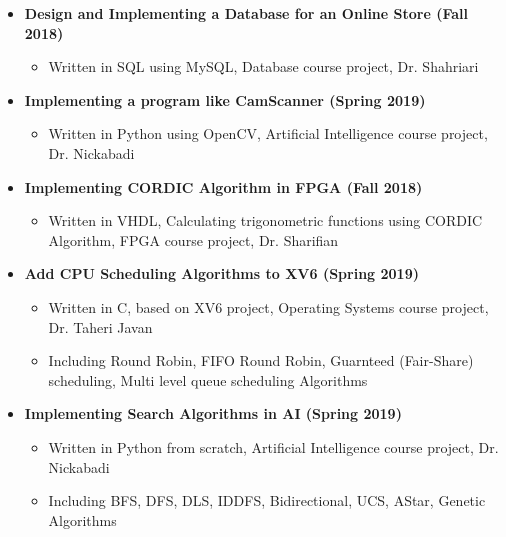 \begin{itemize}
\vspace{+1 em}
	\item \textbf{Design and Implementing a Database for an Online Store (Fall 2018)} 
		\begin{itemize}
			\item Written in SQL using MySQL, Database course project, Dr. Shahriari
		\end{itemize}	

\vspace{+1 em}
	\item \textbf{Implementing a program like CamScanner (Spring 2019)} 
		\begin{itemize}
			\item Written in Python using OpenCV, Artificial Intelligence course project, Dr. Nickabadi
		\end{itemize}	
					
			\vspace{+1 em}
	\item \textbf{Implementing CORDIC Algorithm in FPGA (Fall 2018)} 
		\begin{itemize}
			\item Written in VHDL, Calculating trigonometric functions using CORDIC Algorithm, FPGA course project, Dr. Sharifian
		\end{itemize}	
		
		\vspace{+1 em}
	\item \textbf{Add CPU Scheduling Algorithms to XV6 (Spring 2019)} 
		\begin{itemize}
			\item Written in C, based on XV6 project, Operating Systems course project, Dr. Taheri Javan
			\item Including Round Robin, FIFO Round Robin, Guarnteed (Fair-Share) scheduling, Multi level queue scheduling Algorithms
		\end{itemize}	

	\vspace{+1 em}
	\item \textbf{Implementing Search Algorithms in AI (Spring 2019)} 
		\begin{itemize}
			\item Written in Python from scratch, Artificial Intelligence course project, Dr. Nickabadi
			\item Including BFS, DFS, DLS, IDDFS, Bidirectional, UCS, AStar, Genetic Algorithms
		\end{itemize}	
				

\end{itemize}
